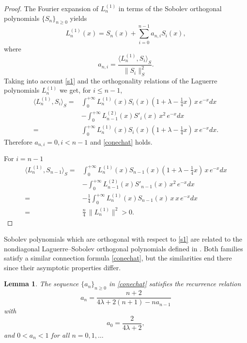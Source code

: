 \documentclass[reqno,10pt]{amsart}
\theoremstyle{plain}
\newtheorem{lemma}[theorem]{Lemma}
\numberwithin{equation}{section}
\numberwithin{figure}{section}
\begin{document}
\begin{proof}
The Fourier expansion of $L_n^{(1)}$ in terms of the Sobolev orthogonal polynomials $\{S_n\}_{n\geqslant 0}$ yields
$$
L_n^{(1)}(x)= S_n(x)+\sum_{i=0}^{n-1} a_{n,i} S_i(x),
$$
where
$$
a_{n,i}=\frac{\langle L_n^{(1)}, S_i \rangle_S }{\|S_i \|_S^2}.
$$
Taking into account \eqref{s1} and the orthogonality relations of the Laguerre polynomials $L^{(1)}_{n}$ we get, for $i\leqslant n-1$,
$$
\begin{aligned}
\langle L_n^{(1)}, S_i \rangle_S = &  \int_{0}^{+\infty} L^{(1)}_{n}(x) S_i(x) ( 1 + \lambda - \frac{1}{4} x) \, x\,e^{-x}dx  \\
& - \int_{0}^{+\infty} L^{(2)}_{n-1}(x) S'_i(x) \, x^2\,e^{-x}dx \\
= & \int_{0}^{+\infty} L^{(1)}_{n}(x) S_i(x) ( 1 + \lambda - \frac{1}{4} x) \, x\,e^{-x}dx.
\end{aligned}
$$
Therefore $a_{n,i}=0, i<n-1$ and \eqref{conechat} holds.

For $i = n-1$
$$
\begin{aligned}
\langle L_n^{(1)}, S_{n-1} \rangle_S = &  \int_{0}^{+\infty} L^{(1)}_{n}(x) S_{n-1}(x) ( 1 + \lambda - \frac{1}{4} x) \, x\,e^{-x}dx  \\
& - \int_{0}^{+\infty} L^{(2)}_{n-1}(x) S'_{n-1}(x) \, x^2\,e^{-x}dx \\
= & - \frac{1}{4}\int_{0}^{+\infty} L^{(1)}_{n}(x) S_{n-1}(x) \, x \, x\,e^{-x}dx\\
= & \frac{n}{4} \,  \|L^{(1)}_n\|^2 >0.
\end{aligned}
$$
\end{proof}

Sobolev polynomials which are orthogonal with respect to \eqref{s1} are related to the nondiagonal Laguerre--Sobolev orthogonal polynomials defined in \cite{MMB97}. Both families satisfy a similar connection formula \eqref{conechat}, but the similarities end there since their asymptotic properties differ.

\medskip

\begin{lemma} The sequence $\{a_n\}_{n\geq 0}$ in \eqref{conechat} satisfies the recurrence relation
\begin{equation} \label{rec_rel_an}
a_n = \frac{n+2}{4 \lambda + 2(n+1) - n a_{n-1}}
\end{equation}
with
$$
a_0 = \frac{2}{4 \lambda + 2},
$$
and $0 < a_n < 1$ for all $n = 0, 1, \ldots$
\end{lemma}
\end{document}
